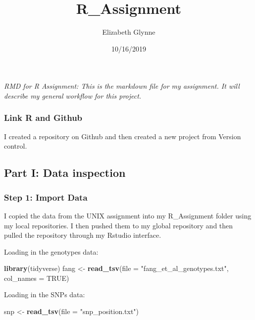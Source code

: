 \documentclass[]{article}
\title{R\_Assignment}
\author{Elizabeth Glynne}
\date{10/16/2019}
\newenvironment{Shaded}{\begin{snugshade}}{\end{snugshade}}
\newcommand{\DataTypeTok}[1]{\textcolor[rgb]{0.13,0.29,0.53}{#1}}
\newcommand{\KeywordTok}[1]{\textcolor[rgb]{0.13,0.29,0.53}{\textbf{#1}}}
\newcommand{\NormalTok}[1]{#1}
\newcommand{\OtherTok}[1]{\textcolor[rgb]{0.56,0.35,0.01}{#1}}
\newcommand{\StringTok}[1]{\textcolor[rgb]{0.31,0.60,0.02}{#1}}
\begin{document}
\maketitle

\emph{RMD for R Assignment: This is the markdown file for my assignment.
It will describe my general workflow for this project.}

\hypertarget{link-r-and-github}{%
\subsubsection{Link R and Github}\label{link-r-and-github}}

I created a repository on Github and then created a new project from
Version control.

\hypertarget{part-i-data-inspection}{%
\subsection{Part I: Data inspection}\label{part-i-data-inspection}}

\hypertarget{step-1-import-data}{%
\subsubsection{Step 1: Import Data}\label{step-1-import-data}}

I copied the data from the UNIX assignment into my R\_Assignment folder
using my local repositories. I then pushed them to my global repository
and then pulled the repository through my Rstudio interface.

Loading in the genotypes data:

\begin{Shaded}
\begin{Highlighting}[]
\KeywordTok{library}\NormalTok{(tidyverse)}
\NormalTok{fang <-}\StringTok{ }\KeywordTok{read_tsv}\NormalTok{(}\DataTypeTok{file =} \StringTok{"fang_et_al_genotypes.txt"}\NormalTok{, }\DataTypeTok{col_names =} \OtherTok{TRUE}\NormalTok{)}
\end{Highlighting}
\end{Shaded}

Loading in the SNPs data:

\begin{Shaded}
\begin{Highlighting}[]
\NormalTok{snp <-}\StringTok{ }\KeywordTok{read_tsv}\NormalTok{(}\DataTypeTok{file =} \StringTok{"snp_position.txt"}\NormalTok{)}
\end{Highlighting}
\end{Shaded}
\end{document}
